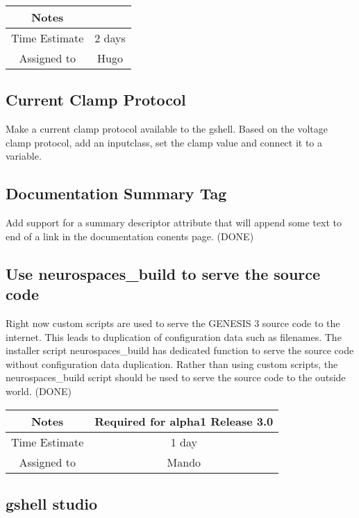 \documentclass[12pt]{article}
\begin{document}
{
  \vspace{5mm}
  \centering
  \begin{tabular}{|c|c|}
    \hline
    Notes
    & \\
    \hline
    Time Estimate
    & 2 days \\
    \hline
    Assigned to
    & Hugo \\
    \hline
  \end{tabular}
}

\subsection{Current Clamp Protocol}

Make a current clamp protocol available to the gshell.  Based on the
voltage clamp protocol, add an inputclass, set the clamp value and
connect it to a variable.


\subsection{Documentation Summary Tag}

Add support for a summary descriptor attribute that will append
some text to end of a link in the documentation conents page. (DONE)


\subsection{Use neurospaces\_build to serve the source code}

Right now custom scripts are used to serve the GENESIS 3 source code
to the internet.  This leads to duplication of configuration data such
as filenames.  The installer script neurospaces\_build has dedicated
function to serve the source code without configuration data
duplication.  Rather than using custom scripts, the neurospaces\_build
script should be used to serve the source code to the outside world. (DONE)

{
  \vspace{5mm}
  \centering
  \begin{tabular}{|c|c|}
    \hline
    Notes
    & Required for alpha1 Release 3.0 \\
    \hline
    Time Estimate
    & 1 day \\
    \hline
    Assigned to
    & Mando \\
    \hline
  \end{tabular}
}


\subsection{gshell studio}
\end{document}
